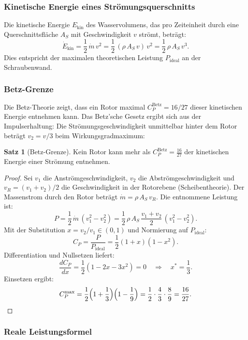 ﻿\documentclass[a4paper,12pt]{article}
\theoremstyle{definition}
\newtheorem{satz}{Satz}
\begin{document}
\subsubsection{Kinetische Energie eines Strömungsquerschnitts}

Die kinetische Energie $E_{\mathrm{kin}}$ des Wasservolumens, das pro Zeiteinheit durch
eine Querschnittsfläche $A_S$ mit Geschwindigkeit $v$ strömt, beträgt:
\[
  \dot{E}_{\mathrm{kin}} = \frac{1}{2}\,\dot{m}\,v^2 = \frac{1}{2}\,(\rho\,A_S\,v)\,v^2
  = \frac{1}{2}\,\rho\,A_S\,v^3.
\]
Dies entspricht der maximalen theoretischen Leistung $P_{\mathrm{ideal}}$ an der Schraubenwand.

\subsubsection{Betz-Grenze}

Die Betz-Theorie zeigt, dass ein Rotor maximal $C_P^{\mathrm{Betz}} = 16/27$ dieser
kinetischen Energie entnehmen kann. Das Betz'sche Gesetz ergibt sich aus der
Impulserhaltung: Die Strömungsgeschwindigkeit unmittelbar hinter dem Rotor beträgt
$v_2 = v/3$ beim Wirkungsgradmaximum:

\begin{satz}[Betz-Grenze]
\label{satz:betz}
Kein Rotor kann mehr als $C_P^{\mathrm{Betz}} = \frac{16}{27}$ der kinetischen Energie
einer Strömung entnehmen.
\end{satz}

\begin{proof}
Sei $v_1$ die Anströmgeschwindigkeit, $v_2$ die Abströmgeschwindigkeit und $v_R =
(v_1 + v_2)/2$ die Geschwindigkeit in der Rotorebene (Scheibentheorie). Der
Massenstrom durch den Rotor beträgt $\dot{m} = \rho\,A_S\,v_R$. Die entnommene
Leistung ist:
\[
  P = \frac{1}{2}\,\dot{m}\,(v_1^2 - v_2^2)
    = \frac{1}{2}\,\rho\,A_S\,\frac{v_1+v_2}{2}\,(v_1^2-v_2^2).
\]
Mit der Substitution $x = v_2/v_1 \in (0, 1)$ und Normierung auf $P_{\mathrm{ideal}}$:
\[
  C_P = \frac{P}{P_{\mathrm{ideal}}} = \frac{1}{2}(1+x)(1-x^2).
\]
Differentiation und Nullsetzen liefert:
\[
  \frac{dC_P}{dx} = \frac{1}{2}(1 - 2x - 3x^2) = 0 \quad\Rightarrow\quad x^* = \frac{1}{3}.
\]
Einsetzen ergibt:
\[
  C_P^{\max} = \frac{1}{2}\Bigl(1+\frac{1}{3}\Bigr)\Bigl(1-\frac{1}{9}\Bigr)
             = \frac{1}{2} \cdot \frac{4}{3} \cdot \frac{8}{9} = \frac{16}{27}. \qedhere
\]
\end{proof}

\subsubsection{Reale Leistungsformel}
\end{document}

